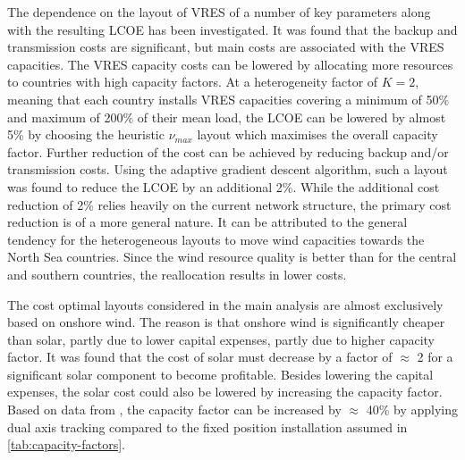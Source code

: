 \documentclass[a4paper, 5p, sort&compress]{elsarticle}%
\begin{document}
The dependence on the layout of VRES of a number of key parameters
along with the resulting LCOE has been investigated. It was found that
the backup and transmission costs are significant, but main costs are
associated with the VRES capacities. The VRES capacity costs can be
lowered by allocating more resources to countries with high capacity
factors. At a heterogeneity factor of $K = 2$, meaning that each
country installs VRES capacities covering a minimum of 50\% and
maximum of 200\% of their mean load, the LCOE can be lowered by almost
5\% by choosing the heuristic $\nu_{max}$ layout which maximises the
overall capacity factor. Further reduction of the cost can be achieved
by reducing backup and/or transmission costs. Using the adaptive
gradient descent algorithm, such a layout was found to reduce the LCOE
by an additional 2\%. While the additional cost reduction of 2\%
relies heavily on the current network structure, the primary cost
reduction is of a more general nature. It can be attributed to the
general tendency for the heterogeneous layouts to move wind capacities
towards the North Sea countries. Since the wind resource quality is
better than for the central and southern countries, the reallocation
results in lower costs.



The cost optimal layouts considered in the main analysis are almost
exclusively based on onshore wind. The reason is that onshore wind is
significantly cheaper than solar, partly due to lower capital
expenses, partly due to higher capacity factor. It was found that the
cost of solar must decrease by a factor of $\approx$ 2 for a
significant solar component to become profitable. Besides lowering the
capital expenses, the solar cost could also be lowered by increasing
the capacity factor. Based on data from \cite{REA}, the capacity factor can
be increased by $\approx$ 40\% by applying dual axis tracking compared
to the fixed position installation assumed in
\cref{tab:capacity-factors}. %
\end{document}
